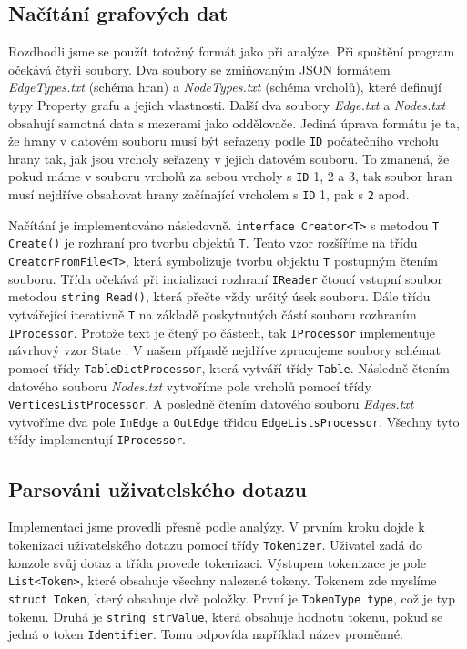 \subsection{Načítání grafových dat}

Rozdhodli jsme se použít totožný formát jako při analýze.
Při spuštění program očekává čtyři soubory.
Dva soubory se zmiňovaným JSON formátem \textit{EdgeTypes.txt} (schéma hran) a \textit{NodeTypes.txt} (schéma vrcholů), které definují typy Property grafu a jejich vlastnosti.
Další dva soubory \textit{Edge.txt} a \textit{Nodes.txt} obsahují samotná data s mezerami jako oddělovače.
Jediná úprava formátu je ta, že hrany v datovém souboru musí být seřazeny podle \texttt{ID} počátečního vrcholu hrany tak, jak jsou vrcholy seřazeny v jejich datovém souboru.
To zmanená, že pokud máme v souboru vrcholů za sebou vrcholy s \texttt{ID} 1, 2 a 3, tak soubor hran musí nejdříve obsahovat hrany začínající vrcholem s \texttt{ID} 1, pak s \texttt{2} apod.

Načítání je implementováno následovně.
\texttt{interface Creator<T>} s metodou \texttt{T Create()} je rozhraní pro tvorbu objektů \texttt{T}.
Tento vzor rozšíříme na třídu \texttt{CreatorFromFile<T>}, která symbolizuje tvorbu objektu \texttt{T} postupným čtením souboru.
Třída očekává při incializaci rozhraní \texttt{IReader} čtoucí vstupní soubor metodou \texttt{string Read()}, která přečte vždy určitý úsek souboru.
Dále třídu vytvářející iterativně \texttt{T} na základě poskytnutých částí souboru rozhraním \texttt{IProcessor}.
Protože text je čtený po částech, tak \texttt{IProcessor} implementuje návrhový vzor State \citep[str. 305]{patterns}.
V našem případě nejdříve zpracujeme soubory schémat pomocí třídy \texttt{TableDictProcessor}, která vytváří třídy \texttt{Table}.
Následně čtením datového souboru \textit{Nodes.txt} vytvoříme pole vrcholů pomocí třídy \texttt{VerticesListProcessor}.
A posledně čtením datového souboru \textit{Edges.txt} vytvoříme dva pole \texttt{InEdge} a \texttt{OutEdge} třidou \texttt{EdgeListsProcessor}. 
Všechny tyto třídy implementují \texttt{IProcessor}.

\subsection{Parsováni uživatelského dotazu}

Implementaci jsme provedli přesně podle analýzy.
V prvním kroku dojde k tokenizaci uživatelského dotazu pomocí třídy \texttt{Tokenizer}.
Uživatel zadá do konzole svůj dotaz a třída provede tokenizaci.
Výstupem tokenizace je pole \texttt{List<Token>}, které obsahuje všechny nalezené tokeny.
Tokenem zde myslíme \texttt{struct Token}, který obsahuje dvě položky.
První je \texttt{TokenType type}, což je typ tokenu.
Druhá je \texttt{string strValue}, která obsahuje hodnotu tokenu, pokud se jedná o token \texttt{Identifier}.
Tomu odpovída například název proměnné.

